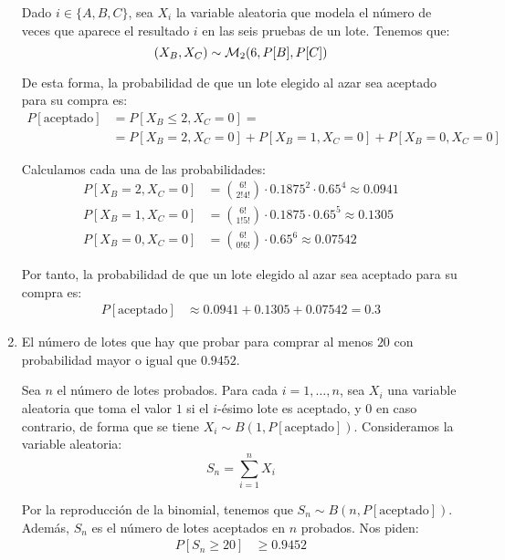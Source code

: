 \begin{ejercicio}
\begin{enumerate}
        Dado $i\in \{A,B,C\}$, sea $X_i$ la variable aleatoria que modela el número de veces que aparece el resultado $i$ en las seis pruebas de un lote. Tenemos que:
        \begin{equation*}
            (X_B, X_C) \sim \mathcal{M}_2(6,P[B],P[C])
        \end{equation*}

        De esta forma, la probabilidad de que un lote elegido al azar sea aceptado para su compra es:
        \begin{align*}
            P[\text{aceptado}] &= P[X_B \leq 2, X_C = 0]
            =\\&= P[X_B=2, X_C=0] + P[X_B=1, X_C=0] + P[X_B=0, X_C=0]
        \end{align*}

        Calculamos cada una de las probabilidades:
        \begin{align*}
            P[X_B=2, X_C=0] &= \binom{6!}{2!4!} \cdot 0.1875^2 \cdot 0.65^4 \approx 0.0941\\
            P[X_B=1, X_C=0] &= \binom{6!}{1!5!} \cdot 0.1875 \cdot 0.65^5 \approx 0.1305\\
            P[X_B=0, X_C=0] &= \binom{6!}{0!6!} \cdot 0.65^6 \approx 0.07542
        \end{align*}

        Por tanto, la probabilidad de que un lote elegido al azar sea aceptado para su compra es:
        \begin{align*}
            P[\text{aceptado}] &\approx 0.0941 + 0.1305 + 0.07542 = 0.3
        \end{align*}

        \item El número de lotes que hay que probar para comprar al menos $20$ con probabilidad mayor o igual que $0.9452$.
        
        Sea $n$ el número de lotes probados. Para cada $i=1, \ldots, n$, sea $X_i$ una variable aleatoria que toma el valor $1$ si el $i$-ésimo lote es aceptado, y $0$ en caso contrario, de forma que se tiene $X_i \sim B(1, P[\text{aceptado}])$. Consideramos la variable aleatoria:
        \[
            S_{n} = \sum_{i=1}^{n} X_i
        \]

        Por la reproducción de la binomial, tenemos que $S_{n} \sim B(n, P[\text{aceptado}])$. Además, $S_{n}$ es el número de lotes aceptados en $n$ probados. Nos piden:
        \begin{align*}
            P[S_{n} \geq 20] &\geq 0.9452
        \end{align*}


\end{enumerate}
\end{ejercicio}
